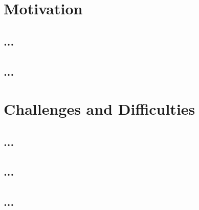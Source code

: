     \section{Motivation}
    \subsection{...}

    \lipsum[6-10]

    \subsection{...}


    \section{Challenges and Difficulties}
    \subsection{...}

    \lipsum[11-15]

    \subsection{...}

    \subsection{...}



